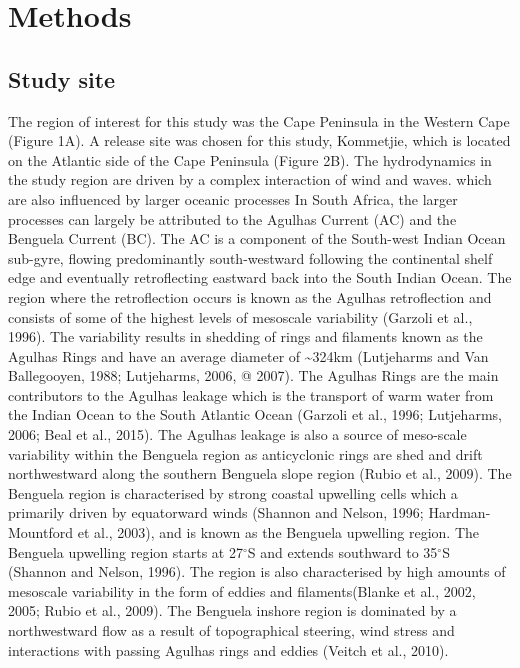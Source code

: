\documentclass[
]{article}
\begin{document}
\hypertarget{methods}{%
\section{Methods}\label{methods}}

\hypertarget{study-site}{%
\subsection{Study site}\label{study-site}}

The region of interest for this study was the Cape Peninsula in the
Western Cape (Figure 1A). A release site was chosen for this study,
Kommetjie, which is located on the Atlantic side of the Cape Peninsula
(Figure 2B). The hydrodynamics in the study region are driven by a
complex interaction of wind and waves. which are also influenced by
larger oceanic processes In South Africa, the larger processes can
largely be attributed to the Agulhas Current (AC) and the Benguela
Current (BC). The AC is a component of the South-west Indian Ocean
sub-gyre, flowing predominantly south-westward following the continental
shelf edge and eventually retroflecting eastward back into the South
Indian Ocean. The region where the retroflection occurs is known as the
Agulhas retroflection and consists of some of the highest levels of
mesoscale variability (Garzoli et al., 1996). The variability results in
shedding of rings and filaments known as the Agulhas Rings and have an
average diameter of \textasciitilde324km (Lutjeharms and Van
Ballegooyen, 1988; Lutjeharms, 2006, @ 2007). The Agulhas Rings are the
main contributors to the Agulhas leakage which is the transport of warm
water from the Indian Ocean to the South Atlantic Ocean (Garzoli et al.,
1996; Lutjeharms, 2006; Beal et al., 2015). The Agulhas leakage is also
a source of meso-scale variability within the Benguela region as
anticyclonic rings are shed and drift northwestward along the southern
Benguela slope region (Rubio et al., 2009). The Benguela region is
characterised by strong coastal upwelling cells which a primarily driven
by equatorward winds (Shannon and Nelson, 1996; Hardman-Mountford et
al., 2003), and is known as the Benguela upwelling region. The Benguela
upwelling region starts at 27\(^\circ\)S and extends southward to
35\(^\circ\)S (Shannon and Nelson, 1996). The region is also
characterised by high amounts of mesoscale variability in the form of
eddies and filaments(Blanke et al., 2002, 2005; Rubio et al., 2009). The
Benguela inshore region is dominated by a northwestward flow as a result
of topographical steering, wind stress and interactions with passing
Agulhas rings and eddies (Veitch et al., 2010).
\end{document}
